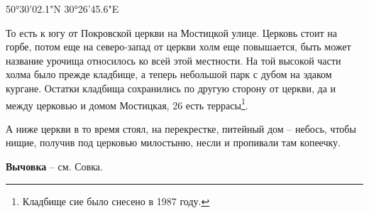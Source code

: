 50°30'02.1"N 30°26'45.6"E

То есть к югу от Покровской церкви на Мостицкой улице. Церковь стоит на горбе, потом еще на северо-запад от церкви холм еще повышается, быть может название урочища относилось ко всей этой местности.  На той высокой части холма было прежде кладбище, а теперь небольшой парк с дубом на эдаком кургане. Остатки кладбища сохранились по другую сторону от церкви, да и между церковью и домом Мостицкая, 26 есть террасы\footnote{Кладбище сие было снесено в 1987 году.}.

А ниже церкви в то время стоял, на перекрестке, питейный дом – небось, чтобы нищие, получив под церковью милостыню, несли и пропивали там копеечку.\\

\medskip

\textbf{Вычовка} – см. Совка.\\
